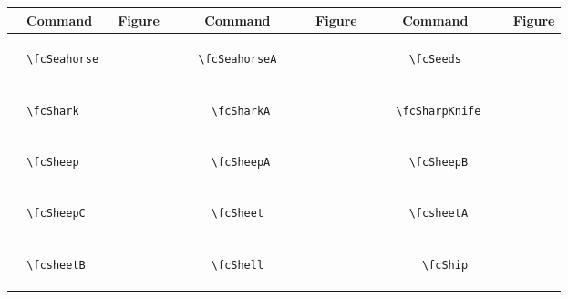 \documentclass[x11names]{article}
\begin{document}
\begin{table}[H]\centering\begin{tabular}{|c|c|c|c|c|c|}\hline{\bf Command} & {\bf Figure} & {\bf Command} & {\bf Figure} & {\bf Command} & {\bf Figure}\\	\hline	&\multirow{5}{*}{	\fcSeahorse	[scale=0.4]} & &\multirow{5}{*}{	\fcSeahorseA	[scale=0.4]} & &\multirow{5}{*}{	\fcSeeds	[scale=0.4]}\\	& & & & & \\	& & & & & \\	\verb|	\fcSeahorse	| & & \verb|	\fcSeahorseA	| & & \verb|	\fcSeeds	| & \\	& & & & & \\	& & & & & \\	& & & & & \\	\hline									
		&\multirow{5}{*}{	\fcShark	[scale=0.4]} & &\multirow{5}{*}{	\fcSharkA	[scale=0.4]} & &\multirow{5}{*}{	\fcSharpKnife	[scale=0.4]}\\	& & & & & \\	& & & & & \\	\verb|	\fcShark	| & & \verb|	\fcSharkA	| & & \verb|	\fcSharpKnife	| & \\	& & & & & \\	& & & & & \\	& & & & & \\	\hline									
		&\multirow{5}{*}{	\fcSheep	[scale=0.8]} & &\multirow{5}{*}{	\fcSheepA	[scale=0.4]} & &\multirow{5}{*}{	\fcSheepB	[scale=0.4]}\\	& & & & & \\	& & & & & \\	\verb|	\fcSheep	| & & \verb|	\fcSheepA	| & & \verb|	\fcSheepB	| & \\	& & & & & \\	& & & & & \\	& & & & & \\	\hline									
		&\multirow{5}{*}{	\fcSheepC	[scale=0.4]} & &\multirow{5}{*}{	\fcSheet	[scale=0.8]} & &\multirow{5}{*}{	\fcsheetA	[scale=0.4]}\\	& & & & & \\	& & & & & \\	\verb|	\fcSheepC	| & & \verb|	\fcSheet	| & & \verb|	\fcsheetA	| & \\	& & & & & \\	& & & & & \\	& & & & & \\	\hline									
		&\multirow{5}{*}{	\fcsheetB	[scale=0.4]} & &\multirow{5}{*}{	\fcShell	[scale=0.4]} & &\multirow{5}{*}{	\fcShip	[scale=0.8]}\\	& & & & & \\	& & & & & \\	\verb|	\fcsheetB	| & & \verb|	\fcShell	| & & \verb|	\fcShip	| & \\	& & & & & \\	& & & & & \\	& & & & & \\	\hline									

\end{tabular}
\end{table}
\end{document}
